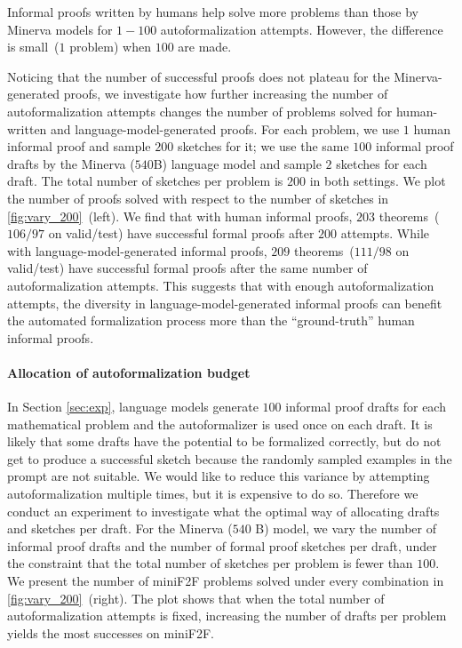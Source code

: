 Informal proofs written by humans help solve more problems than those by Minerva models for $1-100$ autoformalization attempts. However, the difference is small~($1$ problem) when $100$ are made.

Noticing that the number of successful proofs does not plateau for the Minerva-generated proofs, we investigate how further increasing the number of autoformalization attempts changes the number of problems solved for human-written and language-model-generated proofs. For each problem, we use $1$ human informal proof and sample $200$ sketches for it; we use the same $100$ informal proof drafts by the Minerva ($540$B) language model and sample $2$ sketches for each draft. The total number of sketches per problem is $200$ in both settings. We plot the number of proofs solved with respect to the number of sketches in \autoref{fig:vary_200}~(left). We find that with human informal proofs, $203$ theorems~($106/97$ on valid/test) have successful formal proofs after $200$ attempts. While with language-model-generated informal proofs, $209$ theorems~($111/98$ on valid/test) have successful formal proofs after the same number of autoformalization attempts. This suggests that with enough autoformalization attempts, the diversity in language-model-generated informal proofs can benefit the automated formalization process more than the ``ground-truth'' human informal proofs.

\paragraph{Allocation of autoformalization budget} In Section \ref{sec:exp}, language models generate $100$ informal proof drafts for each mathematical problem and the autoformalizer is used once on each draft. It is likely that some drafts have the potential to be formalized correctly, but do not get to produce a successful sketch because the randomly sampled examples in the prompt are not suitable. We would like to reduce this variance by attempting autoformalization multiple times, but it is expensive to do so. Therefore we conduct an experiment to investigate what the optimal way of allocating drafts and sketches per draft. For the Minerva ($540$ B) model, we vary the number of informal proof drafts and the number of formal proof sketches per draft, under the constraint that the total number of sketches per problem is fewer than $100$. We present the number of miniF2F problems solved under every combination in \autoref{fig:vary_200}~(right).
The plot shows that when the total number of autoformalization attempts is fixed, increasing the number of drafts per problem yields the most successes on miniF2F.

